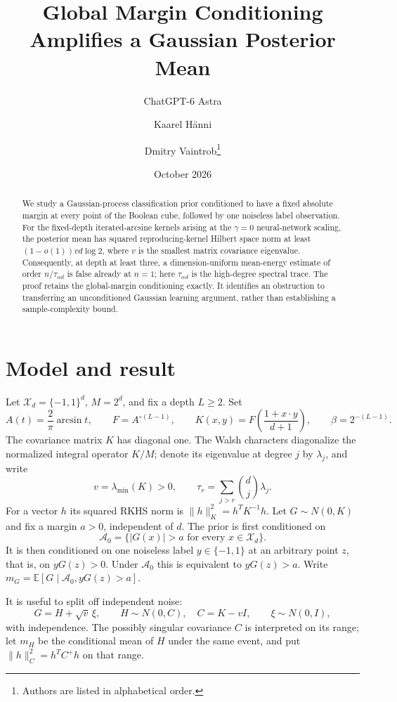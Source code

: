\documentclass[11pt]{article}
\title{Global Margin Conditioning Amplifies a Gaussian Posterior Mean}
\author{ChatGPT-6 Astra \and Kaarel H\"anni \and Dmitry Vaintrob\thanks{Authors are listed in alphabetical order.}}
\date{October 2026}
\newcommand{\E}{\mathbb E}
\begin{document}
\maketitle
\begin{abstract}
We study a Gaussian-process classification prior conditioned to have a fixed absolute margin at every point of the Boolean cube, followed by one noiseless label observation. For the fixed-depth iterated-arcsine kernels arising at the $\gamma=0$ neural-network scaling, the posterior mean has squared reproducing-kernel Hilbert space norm at least $(1-o(1))v d\log2$, where $v$ is the smallest matrix covariance eigenvalue. Consequently, at depth at least three, a dimension-uniform mean-energy estimate of order $n/\tau_{\alpha d}$ is false already at $n=1$; here $\tau_{\alpha d}$ is the high-degree spectral trace. The proof retains the global-margin conditioning exactly. It identifies an obstruction to transferring an unconditioned Gaussian learning argument, rather than establishing a sample-complexity bound.
\end{abstract}

\section{Model and result}
Let $\mathcal X_d=\{-1,1\}^d$, $M=2^d$, and fix a depth $L\ge2$.
Set
\[
 A(t)=\frac2\pi\arcsin t,\qquad F=A^{\circ(L-1)},\qquad
 K(x,y)=F\!\left(\frac{1+x\cdot y}{d+1}\right),\qquad
 \beta=2^{-(L-1)}.
\]
The covariance matrix $K$ has diagonal one. The Walsh characters diagonalize the normalized integral operator $K/M$; denote its eigenvalue at degree $j$ by $\lambda_j$, and write
\[
 v=\lambda_{\min}(K)>0,\qquad
 \tau_r=\sum_{j>r}\binom dj\lambda_j.
\]
For a vector $h$ its squared RKHS norm is $\|h\|_K^2=h^TK^{-1}h$.
Let $G\sim N(0,K)$ and fix a margin $a>0$, independent of $d$.
The prior is first conditioned on
\[
 \mathcal A_0=\{|G(x)|>a\text{ for every }x\in\mathcal X_d\}.
\]
It is then conditioned on one noiseless label $y\in\{-1,1\}$ at an arbitrary point $z$, that is, on $yG(z)>0$.
Under $\mathcal A_0$ this is equivalent to $yG(z)>a$.
Write $m_G=\E[G\mid\mathcal A_0,yG(z)>a]$.

It is useful to split off independent noise:
\[
 G=H+\sqrt v\,\xi,\qquad H\sim N(0,C),\quad C=K-vI,
 \qquad \xi\sim N(0,I),
\]
with independence. The possibly singular covariance $C$ is interpreted on its range; let $m_H$ be the conditional mean of $H$ under the same event, and put $\|h\|_C^2=h^TC^+h$ on that range.
\end{document}
